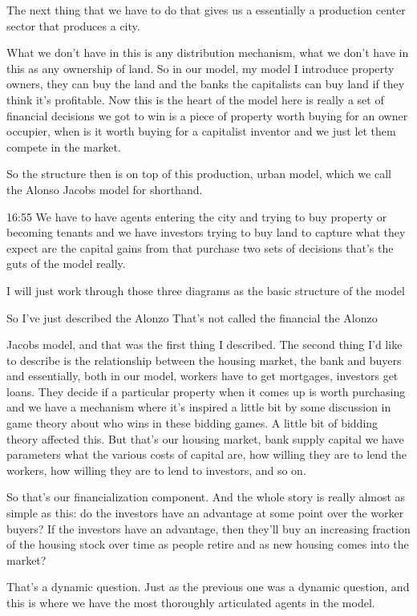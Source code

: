 The next thing that we have to do that gives us a essentially a production center sector that produces a city.

What we don't have in this is any distribution mechanism, what we don't have in this as any ownership of land. So in our model, my model I introduce property owners, they can buy the land and the banks the capitalists can buy land if they think it's profitable. Now this is the heart of the model here is really a set of financial decisions we got to win is a piece of property worth buying for an owner occupier, when is it worth buying for a capitalist inventor and we just let them compete in the market.

So the structure then is on top of this production, urban model, which we call the Alonso Jacobs model for shorthand.

16:55
We have to have agents entering the city and trying to buy property or becoming tenants and we have investors trying to buy land to capture what they expect are the capital gains from that purchase two sets of decisions that's the guts of the model really.

I will just work through those three diagrams as the basic structure of the model


So I've just described the Alonzo That's not called the financial the Alonzo

Jacobs model, and that was the first thing I described. The second thing I'd like to describe is the relationship between
the housing market, the bank and buyers and essentially, both in our model, workers have to get mortgages, investors get loans. They decide if a particular property when it comes up is worth purchasing and we have a mechanism where it's inspired a little bit by some discussion in game theory about who wins in these bidding games. A little bit of bidding theory affected this. But that's our housing market, bank supply capital we have parameters what the various costs of capital are, how willing they are to lend the workers, how willing they are to lend to investors, and so on.

So that's our financialization component. And the whole story is really almost as simple as this: do the investors have an advantage at some point over the worker buyers? If the investors have an advantage, then they'll buy an increasing fraction of the housing stock over time as people retire and as new housing comes into the market?

That's a dynamic question. Just as the previous one was a dynamic question, 
and this is where we have the most thoroughly articulated agents in the model.

